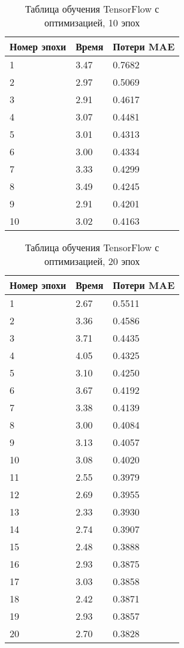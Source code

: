 \documentclass[a4paper,12pt,titlepage,final]{article}
\begin{document}
\begin{table}[H]
\centering
\begin{tabular}{|p{5.4cm}|p{3.8cm}|p{3.8cm}|}
\hline 
Номер эпохи & Время & Потери MAE\\ 
\hline
1 & 3.47 & 0.7682 \\ [1.5ex]
\hline
2 & 2.97 & 0.5069 \\ [1.5ex]
\hline
3 & 2.91 & 0.4617 \\ [1.5ex]
\hline
4 & 3.07 & 0.4481 \\ [1.5ex]
\hline
5 & 3.01 & 0.4313 \\ [1.5ex]
\hline
6 & 3.00 & 0.4334 \\ [1.5ex]
\hline
7 & 3.33 & 0.4299 \\ [1.5ex]
\hline
8 & 3.49 & 0.4245 \\ [1.5ex]
\hline
9 & 2.91 & 0.4201 \\ [1.5ex]
\hline
10 & 3.02 & 0.4163 \\ [1.5ex]
\hline
\end{tabular}
\caption{Таблица обучения TensorFlow с оптимизацией, 10 эпох}
\label{table4}
\end{table}

\begin{table}[H]
\centering
\begin{tabular}{|p{6.4cm}|p{3.2cm}|p{3.2cm}|}
\hline 
Номер эпохи & Время & Потери MAE\\ 
\hline
1 & 2.67 & 0.5511 \\ [1.5ex]
\hline
2 & 3.36 & 0.4586 \\ [1.5ex]
\hline
3 & 3.71 & 0.4435 \\ [1.5ex]
\hline
4 & 4.05 & 0.4325 \\ [1.5ex]
\hline
5 & 3.10 & 0.4250 \\ [1.5ex]
\hline
6 & 3.67 & 0.4192 \\ [1.5ex]
\hline
7 & 3.38 & 0.4139 \\ [1.5ex]
\hline
8 & 3.00 & 0.4084 \\ [1.5ex]
\hline
9 & 3.13 & 0.4057 \\ [1.5ex]
\hline
10 & 3.08 & 0.4020 \\ [1.5ex]
\hline
11 & 2.55 & 0.3979 \\ [1.5ex]
\hline
12 & 2.69 & 0.3955 \\ [1.5ex]
\hline
13 & 2.33 & 0.3930 \\ [1.5ex]
\hline
14 & 2.74 & 0.3907 \\ [1.5ex]
\hline
15 & 2.48 & 0.3888 \\ [1.5ex]
\hline
16 & 2.93 & 0.3875 \\ [1.5ex]
\hline
17 & 3.03 & 0.3858 \\ [1.5ex]
\hline
18 & 2.42 & 0.3871 \\ [1.5ex]
\hline
19 & 2.93 & 0.3857 \\ [1.5ex]
\hline
20 & 2.70 & 0.3828 \\ [1.5ex]
\hline
\end{tabular}
\caption{Таблица обучения TensorFlow с оптимизацией, 20 эпох}
\label{table5}
\end{table}
\end{document}
